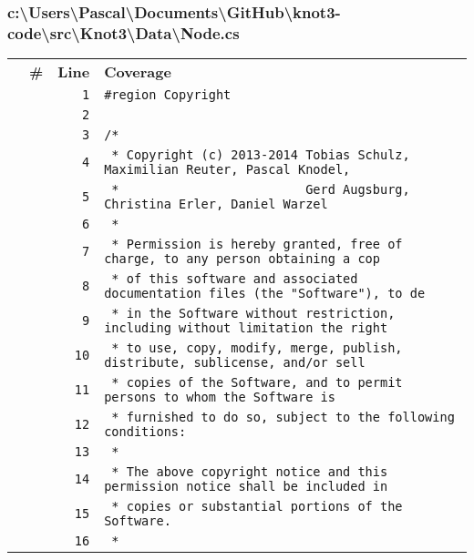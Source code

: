 \documentclass[a4paper,10pt]{article}
\begin{document}
\subsubsection{c:\textbackslash Users\textbackslash Pascal\textbackslash Documents\textbackslash GitHub\textbackslash knot3-code\textbackslash src\textbackslash Knot3\textbackslash Data\textbackslash Node.cs}
\begin{longtable}[l]{lrrl}
\textbf{} & \textbf{\#} & \textbf{Line} & \textbf{Coverage}\\
\cellcolor{gray} &  & \verb~1~ & \verb~#region Copyright~\\
\cellcolor{gray} &  & \verb~2~ & \verb~~\\
\cellcolor{gray} &  & \verb~3~ & \verb~/*~\\
\cellcolor{gray} &  & \verb~4~ & \verb~ * Copyright (c) 2013-2014 Tobias Schulz, Maximilian Reuter, Pascal Knodel,~\\
\cellcolor{gray} &  & \verb~5~ & \verb~ *                         Gerd Augsburg, Christina Erler, Daniel Warzel~\\
\cellcolor{gray} &  & \verb~6~ & \verb~ *~\\
\cellcolor{gray} &  & \verb~7~ & \verb~ * Permission is hereby granted, free of charge, to any person obtaining a cop~\\
\cellcolor{gray} &  & \verb~8~ & \verb~ * of this software and associated documentation files (the "Software"), to de~\\
\cellcolor{gray} &  & \verb~9~ & \verb~ * in the Software without restriction, including without limitation the right~\\
\cellcolor{gray} &  & \verb~10~ & \verb~ * to use, copy, modify, merge, publish, distribute, sublicense, and/or sell~\\
\cellcolor{gray} &  & \verb~11~ & \verb~ * copies of the Software, and to permit persons to whom the Software is~\\
\cellcolor{gray} &  & \verb~12~ & \verb~ * furnished to do so, subject to the following conditions:~\\
\cellcolor{gray} &  & \verb~13~ & \verb~ *~\\
\cellcolor{gray} &  & \verb~14~ & \verb~ * The above copyright notice and this permission notice shall be included in ~\\
\cellcolor{gray} &  & \verb~15~ & \verb~ * copies or substantial portions of the Software.~\\
\cellcolor{gray} &  & \verb~16~ & \verb~ *~\\

\end{longtable}
\end{document}
